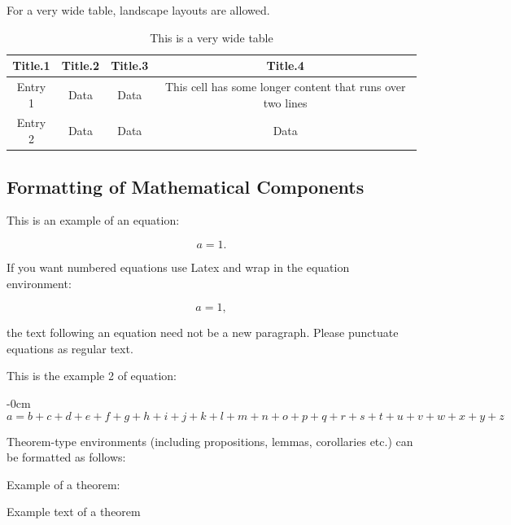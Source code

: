 \documentclass[notspecified,article,submit,moreauthors,pdftex]{Definitions/mdpi}
\begin{document}
For a very wide table, landscape layouts are allowed.

\startlandscape

\begin{table}[H]

\caption{\label{tab:tab2}This is a very wide table}
\begin{tabular}[t]{cccc}
\toprule
Title.1 & Title.2 & Title.3 & Title.4\\
\midrule
Entry 1 & Data & Data & This cell has some longer content that runs over
                               two lines\\
Entry 2 & Data & Data & Data\\
\bottomrule
\end{tabular}
\end{table}

\finishlandscape

\hypertarget{formatting-of-mathematical-components}{%
\subsection{Formatting of Mathematical
Components}\label{formatting-of-mathematical-components}}

This is an example of an equation:

\[
a = 1.
\]

If you want numbered equations use Latex and wrap in the equation
environment:

\begin{equation}
a = 1,
\end{equation}

the text following an equation need not be a new paragraph. Please
punctuate equations as regular text.

This is the example 2 of equation:

\begin{adjustwidth}{-\extralength}{0cm}
\begin{equation}
a = b + c + d + e + f + g + h + i + j + k + l + m + n + o + p + q + r + s + t + 
u + v + w + x + y + z
\end{equation}
\end{adjustwidth}

Theorem-type environments (including propositions, lemmas, corollaries
etc.) can be formatted as follows:

Example of a theorem:

\begin{Theorem}
Example text of a theorem

\end{Theorem}
\end{document}
